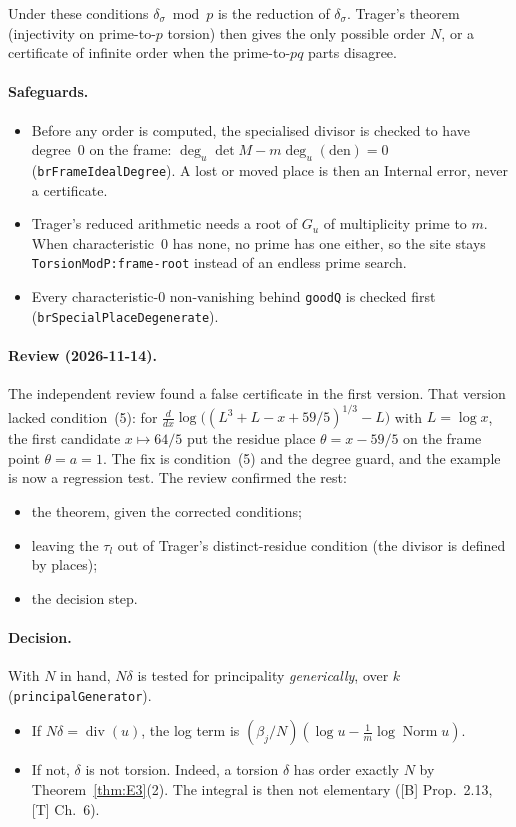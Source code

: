 \documentclass[11pt]{article}
\theoremstyle{definition}
\theoremstyle{remark}
\newcommand{\code}[1]{\texttt{#1}}
\begin{document}
Under these conditions $\delta_\sigma\bmod p$ is the reduction of
$\delta_\sigma$. Trager's theorem (injectivity on prime-to-$p$ torsion) then
gives the only possible order $N$, or a certificate of infinite order when the
prime-to-$pq$ parts disagree.

\paragraph{Safeguards.}
\begin{itemize}
\item Before any order is computed, the specialised divisor is checked to have
  degree~0 on the frame: $\deg_u\det M-m\deg_u(\mathrm{den})=0$
  (\code{brFrameIdealDegree}). A lost or moved place is then an Internal error,
  never a certificate.
\item Trager's reduced arithmetic needs a root of $G_u$ of multiplicity prime to
  $m$. When characteristic~0 has none, no prime has one either, so the site stays
  \code{TorsionModP:frame-root} instead of an endless prime search.
\item Every characteristic-0 non-vanishing behind \code{goodQ} is checked first
  (\code{brSpecialPlaceDegenerate}).
\end{itemize}

\paragraph{Review (2026-11-14).} The independent review found a false
certificate in the first version. That version lacked condition~(5): for
$\frac{d}{dx}\log\bigl((L^3+L-x+59/5)^{1/3}-L\bigr)$ with $L=\log x$, the first
candidate $x\mapsto64/5$ put the residue place $\theta=x-59/5$ on the frame
point $\theta=a=1$. The fix is condition~(5) and the degree guard, and the
example is now a regression test. The review confirmed the rest:
\begin{itemize}
\item the theorem, given the corrected conditions;
\item leaving the $\tau_l$ out of Trager's distinct-residue condition (the
  divisor is defined by places);
\item the decision step.
\end{itemize}

\paragraph{Decision.} With $N$ in hand, $N\delta$ is tested for principality
\emph{generically}, over $k$ (\code{principalGenerator}).
\begin{itemize}
\item If $N\delta=\operatorname{div}(u)$, the log term is
  $(\beta_j/N)(\log u-\tfrac1m\log\operatorname{Norm}u)$.
\item If not, $\delta$ is not torsion. Indeed, a torsion $\delta$ has order
  exactly $N$ by Theorem~\ref{thm:E3}(2). The integral is then not elementary
  ([B] Prop.~2.13, [T] Ch.~6).
\end{itemize}
\end{document}
